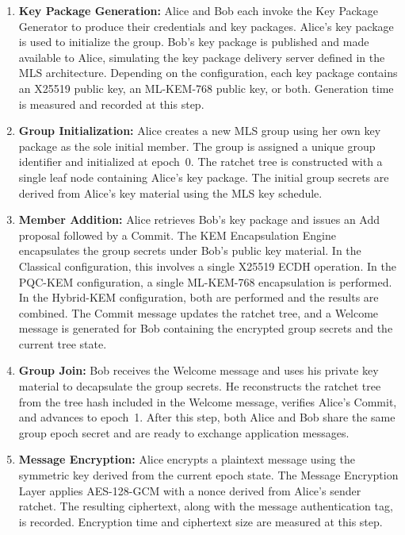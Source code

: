 \documentclass{ieeeaccess}
\begin{document}
\begin{enumerate}
  \item \textbf{Key Package Generation:}
  Alice and Bob each invoke the Key Package Generator to produce their credentials
  and key packages. Alice's key package is used to initialize the group. Bob's key
  package is published and made available to Alice, simulating the key package
  delivery server defined in the MLS architecture. Depending on the configuration,
  each key package contains an X25519 public key, an ML-KEM-768 public key, or both.
  Generation time is measured and recorded at this step.

  \item \textbf{Group Initialization:}
  Alice creates a new MLS group using her own key package as the sole initial member.
  The group is assigned a unique group identifier and initialized at epoch~0. The
  ratchet tree is constructed with a single leaf node containing Alice's key package.
  The initial group secrets are derived from Alice's key material using the MLS key
  schedule.

  \item \textbf{Member Addition:}
  Alice retrieves Bob's key package and issues an Add proposal followed by a Commit.
  The KEM Encapsulation Engine encapsulates the group secrets under Bob's public key
  material. In the Classical configuration, this involves a single X25519 ECDH
  operation. In the PQC-KEM configuration, a single ML-KEM-768 encapsulation is
  performed. In the Hybrid-KEM configuration, both are performed and the results
  are combined. The Commit message updates the ratchet tree, and a Welcome message
  is generated for Bob containing the encrypted group secrets and the current tree
  state.

  \item \textbf{Group Join:}
  Bob receives the Welcome message and uses his private key material to decapsulate
  the group secrets. He reconstructs the ratchet tree from the tree hash included
  in the Welcome message, verifies Alice's Commit, and advances to epoch~1. After
  this step, both Alice and Bob share the same group epoch secret and are ready to
  exchange application messages.

  \item \textbf{Message Encryption:}
  Alice encrypts a plaintext message using the symmetric key derived from the current
  epoch state. The Message Encryption Layer applies AES-128-GCM with a nonce derived
  from Alice's sender ratchet. The resulting ciphertext, along with the message
  authentication tag, is recorded. Encryption time and ciphertext size are measured
  at this step.


\end{enumerate}
\end{document}
